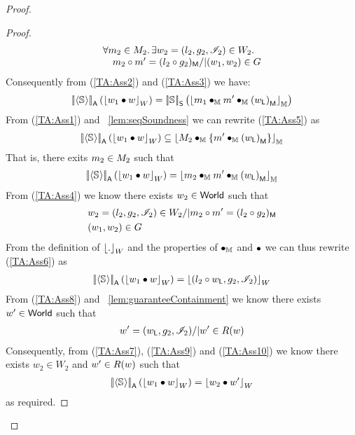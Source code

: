 \begin{theorem}
\begin{proof}
\begin{proof}
\begin{align}
\begin{array}{@{} l @{} }
		\for{m_2 \in M_2} \exsts{w_2 = (l_2, g_2, \lmod_2) \in W_2}\\
		\quad m_2 \composeL m' = 	\heapPart{(l_2  \composeL  g_2)} /| (w_1, w_2) \in \guarantee
	\end{array}
	\label{TA:Ass4}
\end{align}
Consequently from (\ref{TA:Ass2}) and (\ref{TA:Ass3}) we have:
%
\begin{align}
	\left[\!\left| \left\langle \mathbb{S}_{} \right\rangle \right |\! \right]_{\textsf{A}}\left( \left\lfloor w_1 \bullet w \right\rfloor_{W} \right) = \left[\!\left| \mathbb{S}_{} \right |\! \right]_{\textsf{S}}\left( \left\lfloor m_{1} \bullet_{\mathbb{M}} m_{}' \bullet_{\mathbb{M}} \left(w_{\textsf{L}}\right)_{\textsf{M}} \right\rfloor_{\mathbb{M}} \right)
	\label{TA:Ass5}
\end{align}
From (\ref{TA:Ass1}) and \lem~\ref{lem:seqSoundness} we can rewrite (\ref{TA:Ass5}) as
%
\begin{align*}
	\left[\!\left| \left\langle \mathbb{S}_{} \right\rangle \right |\! \right]_{\textsf{A}}\left( \left\lfloor w_1 \bullet w \right\rfloor_{W} \right) \subseteq  \left\lfloor M_{2} \bullet_{\mathbb{M}} \{ m_{}' \bullet_{\mathbb{M}} \left(w_{\textsf{L}}\right)_{\textsf{M}} \}  \right\rfloor_{\mathbb{M}}
\end{align*}
That is, there exits $m_{2} \in M_{2}$ such that 
%
\begin{align}
	\left[\!\left| \left\langle \mathbb{S}_{} \right\rangle \right |\! \right]_{\textsf{A}}\left( \left\lfloor w_1 \bullet w \right\rfloor_{W} \right) =  \left\lfloor m_{2} \bullet_{\mathbb{M}} m_{}' \bullet_{\mathbb{M}} \left(w_{\textsf{L}}\right)_{\textsf{M}}  \right\rfloor_{\mathbb{M}}
	\label{TA:Ass6}
\end{align}
%
From (\ref{TA:Ass4}) we know there exists $w_2 \in \textsf{World}$ such that
\begin{align}
	& w_2 = (l_2, g_2, \mathscr{I}_2) \in W_2 /| m_2 \circ m' = 	(l_2  \circ  g_2)_{\textsf{M}} \label{TA:Ass7}\\
	& (w_1, w_2) \in G	\label{TA:Ass8}
\end{align} 
%
From the definition of $\left\lfloor . \right\rfloor_{W}$ and the properties of $\bullet_{\mathbb{M}}$ and $\bullet$ we can thus rewrite (\ref{TA:Ass6}) as 
\begin{align}
	\left[\!\left| \left\langle \mathbb{S}_{} \right\rangle \right |\! \right]_{\textsf{A}}\left( \left\lfloor w_1 \bullet w \right\rfloor_{W} \right) =  \left\lfloor (l_2 \circ w_{\textsf{L}}, g_2, \mathscr{I}_2) \right\rfloor_{W}
	\label{TA:Ass9}
\end{align}
%
From (\ref{TA:Ass8}) and \lem~\ref{lem:guaranteeContainment} we know there exists $w' \in \textsf{World}$ such that
%
\begin{align}
	w' = (w_{\textsf{L}}, g_2, \mathscr{I}_2) /| w' \in R(w) 
	\label{TA:Ass10}
\end{align}
Consequently, from (\ref{TA:Ass7}), (\ref{TA:Ass9}) and (\ref{TA:Ass10}) we know there exists $w_2 \in W_2$ and $w' \in R(w)$ such that 
%
\begin{align*}
	\left[\!\left| \left\langle \mathbb{S}_{} \right\rangle \right |\! \right]_{\textsf{A}}\left( \left\lfloor w_1 \bullet w \right\rfloor_{W} \right) = \left\lfloor w_2 \bullet w' \right\rfloor_{W}
\end{align*}
%
as required.\vspace{-10pt}
\renewcommand{\qed}{}
\end{proof}
\end{proof}
\end{theorem}
%








